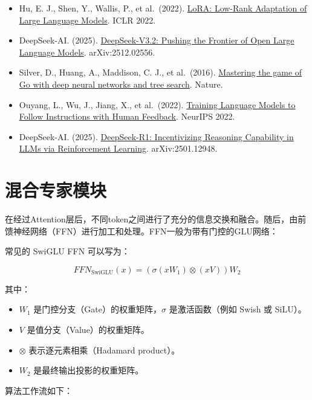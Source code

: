 \begin{itemize}
\tightlist
\item
  Hu, E. J., Shen, Y., Wallis, P., et al.~(2022). \href{https://arxiv.org/abs/2106.09685}{LoRA: Low-Rank Adaptation of Large Language Models}. ICLR 2022.
\item
  DeepSeek-AI. (2025). \href{https://arxiv.org/abs/2512.02556}{DeepSeek-V3.2: Pushing the Frontier of Open Large Language Models}. arXiv:2512.02556.
\item
  Silver, D., Huang, A., Maddison, C. J., et al.~(2016). \href{https://www.nature.com/articles/nature16961}{Mastering the game of Go with deep neural networks and tree search}. Nature.
\item
  Ouyang, L., Wu, J., Jiang, X., et al.~(2022). \href{https://arxiv.org/abs/2203.02155}{Training Language Models to Follow Instructions with Human Feedback}. NeurIPS 2022.
\item
  DeepSeek-AI. (2025). \href{https://arxiv.org/abs/2501.12948}{DeepSeek-R1: Incentivizing Reasoning Capability in LLMs via Reinforcement Learning}. arXiv:2501.12948.
\end{itemize}

\clearpage

\hypertarget{ux6df7ux5408ux4e13ux5bb6ux6a21ux5757}{%
\section{混合专家模块}\label{ux6df7ux5408ux4e13ux5bb6ux6a21ux5757}}

在经过Attention层后，不同token之间进行了充分的信息交换和融合。随后，由前馈神经网络（FFN）进行加工和处理。FFN一般为带有门控的GLU网络：

常见的 SwiGLU FFN 可以写为：

\[
FFN_{\mathrm{SwiGLU}}(x) = (\sigma(xW_1) \otimes (xV))W_2
\]

其中：

\begin{itemize}
\tightlist
\item
  \(W_1\) 是门控分支（Gate）的权重矩阵，\(\sigma\) 是激活函数（例如 Swish 或 SiLU）。
\item
  \(V\) 是值分支（Value）的权重矩阵。
\item
  \(\otimes\) 表示逐元素相乘（Hadamard product）。
\item
  \(W_2\) 是最终输出投影的权重矩阵。
\end{itemize}

算法工作流如下：

